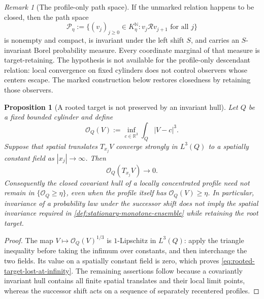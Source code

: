 \documentclass[11pt]{amsart}
\numberwithin{equation}{section}
\theoremstyle{plain}
\newtheorem{proposition}[proposition]{Proposition}
\theoremstyle{definition}
\theoremstyle{remark}
\newtheorem{remark}[remark]{Remark}
\newcommand{\R}{\mathbb R}
\begin{document}
\begin{remark}[The profile-only path space]
If the unmarked relation happens to be closed, then the path space
\begin{equation}\label{eq:actual-descendant-path-space}
 \mathscr P_\eta
 :=\{(v_j)_{j\ge0}\in K_\eta^{\mathbb N}:
           v_j\mathcal Rv_{j+1}\text{ for all }j\}
\end{equation}
is nonempty and compact, is invariant under the left shift \(S\), and carries
an \(S\)-invariant Borel probability measure.  Every coordinate marginal of
that measure is target-retaining.  The hypothesis is not available for the
profile-only descendant relation: local convergence on fixed cylinders does
not control observers whose centers escape.  The marked construction below
restores closedness by retaining those observers.
\end{remark}

\begin{proposition}[A rooted target is not preserved by an invariant hull]
\label{prop:rooted-target-not-hull-invariant}
Let \(Q\) be a fixed bounded cylinder and define
\[
 \mathcal O_Q(V):=\inf_{c\in\R^3}\int_Q|V-c|^3.
\]
Suppose that spatial translates \(T_{x_j}V\) converge strongly in
\(L^3(Q)\) to a spatially constant field as \(|x_j|\to\infty\).  Then
\begin{equation}\label{eq:rooted-target-lost-at-infinity}
 \mathcal O_Q(T_{x_j}V)\longrightarrow0.
\end{equation}
Consequently the closed covariant hull of a locally concentrated profile need
not remain in \(\{\mathcal O_Q\ge\eta\}\), even when the profile itself has
\(\mathcal O_Q(V)\ge\eta\).  In particular, invariance of a probability law
under the successor shift does not imply the spatial invariance required in
\cref{def:stationary-monotone-ensemble} while retaining the root target.
\end{proposition}

\begin{proof}
The map \(V\mapsto\mathcal O_Q(V)^{1/3}\) is \(1\)-Lipschitz in
\(L^3(Q)\): apply the triangle inequality before taking the infimum over
constants, and then interchange the two fields.  Its value on a spatially
constant field is zero, which proves
\eqref{eq:rooted-target-lost-at-infinity}.  The remaining assertions follow
because a covariantly invariant hull contains all finite spatial translates
and their local limit points, whereas the successor shift acts on a sequence
of separately recentered profiles.
\end{proof}
\end{document}
